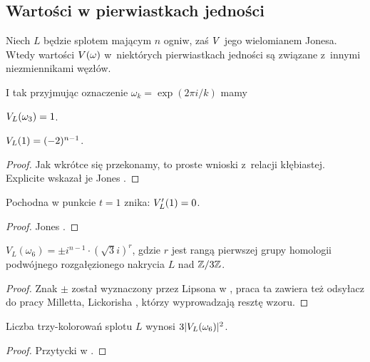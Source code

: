 
\subsection{Wartości w pierwiastkach jedności}
Niech $L$ będzie splotem mającym $n$ ogniw, zaś $V$ jego wielomianem Jonesa.
Wtedy wartości $V(\omega)$ w~niektórych pierwiastkach jedności są związane z~innymi niezmiennikami węzłów.

I tak przyjmując oznaczenie $\omega_k = \exp(2\pi i/k)$ mamy

\begin{proposition}
    \label{prp:jones_at_roots_of_unity}
    $V_L(\omega_3) = 1$.
\end{proposition}

\begin{proposition}
    $V_L(1) = (-2)^{n-1}$.
\end{proposition}

\begin{proof}
%
    Jak wkrótce się przekonamy, to proste wnioski z~relacji kłębiastej.
    Explicite wskazał je Jones \cite[twierdzenie 14, 15]{jones85}.
\end{proof}

\begin{proposition}
    Pochodna w punkcie $t = 1$ znika: $V'_L(1) = 0$.
\end{proposition}

\begin{proof}
    Jones \cite[twierdzenie 16]{jones85}.
\end{proof}

\begin{proposition}
    $V_L(\omega_6) = \pm i^{n-1} \cdot (\sqrt 3i)^r$, gdzie $r$ jest rangą pierwszej grupy homologii podwójnego rozgałęzionego nakrycia $L$ nad $\mathbb Z/3\mathbb Z$.
\end{proposition}

\begin{proof}
%
    Znak $\pm$ został wyznaczony przez Lipsona w \cite{lipson86}, praca ta zawiera też odsyłacz do pracy Milletta, Lickorisha \cite{lickorish86}, którzy wyprowadzają resztę wzoru.
\end{proof}

\begin{proposition}
    Liczba trzy-kolorowań splotu $L$ wynosi $3|V_L(\omega_6)|^2$.
\end{proposition}

\begin{proof}
%
    Przytycki w \cite{przytycki98}.
\end{proof}

